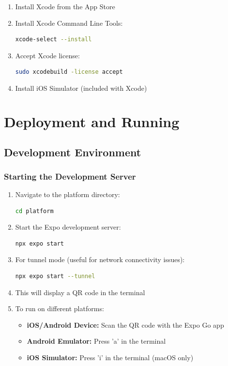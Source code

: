 \documentclass[a4paper,12pt]{article}
\begin{document}
\begin{enumerate}
    \item Install Xcode from the App Store
    \item Install Xcode Command Line Tools:
    \begin{lstlisting}[language=bash]
xcode-select --install
    \end{lstlisting}
    
    \item Accept Xcode license:
    \begin{lstlisting}[language=bash]
sudo xcodebuild -license accept
    \end{lstlisting}
    
    \item Install iOS Simulator (included with Xcode)
\end{enumerate}

\section{Deployment and Running}

\subsection{Development Environment}

\subsubsection{Starting the Development Server}

\begin{enumerate}
    \item Navigate to the platform directory:
    \begin{lstlisting}[language=bash]
cd platform
    \end{lstlisting}
    
    \item Start the Expo development server:
    \begin{lstlisting}[language=bash]
npx expo start
    \end{lstlisting}
    
    \item For tunnel mode (useful for network connectivity issues):
    \begin{lstlisting}[language=bash]
npx expo start --tunnel
    \end{lstlisting}
    
    \item This will display a QR code in the terminal
    \item To run on different platforms:
    \begin{itemize}
        \item \textbf{iOS/Android Device:} Scan the QR code with the Expo Go app
        \item \textbf{Android Emulator:} Press 'a' in the terminal
        \item \textbf{iOS Simulator:} Press 'i' in the terminal (macOS only)
    \end{itemize}
\end{enumerate}
\end{document}
